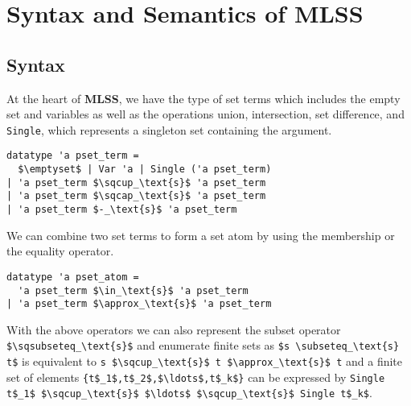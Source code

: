 \documentclass[sigplan,10pt,anonymous,review]{acmart}
\begin{document}
\section{Syntax and Semantics of MLSS\label{sec:semantics}}
\subsection{Syntax}
At the heart of \textbf{MLSS}, we have the type of set terms which includes the empty set and variables as well as the operations union, intersection, set difference, and \lstinline!Single!, which represents a singleton set containing the argument.
\begin{lstlisting}
datatype 'a pset_term =
  $\emptyset$ | Var 'a | Single ('a pset_term)
| 'a pset_term $\sqcup_\text{s}$ 'a pset_term
| 'a pset_term $\sqcap_\text{s}$ 'a pset_term
| 'a pset_term $-_\text{s}$ 'a pset_term
\end{lstlisting}
We can combine two set terms to form a set atom by using the membership or the equality operator.
\begin{lstlisting}
datatype 'a pset_atom =
  'a pset_term $\in_\text{s}$ 'a pset_term
| 'a pset_term $\approx_\text{s}$ 'a pset_term
\end{lstlisting}
With the above operators we can also represent the subset operator \lstinline!$\sqsubseteq_\text{s}$! and enumerate finite sets as \lstinline!$s \subseteq_\text{s} t$! is equivalent to \lstinline!s $\sqcup_\text{s}$ t $\approx_\text{s}$ t! and a finite set of elements \lstinline!{t$_1$,t$_2$,$\ldots$,t$_k$}! can be expressed by \lstinline!Single t$_1$ $\sqcup_\text{s}$ $\ldots$ $\sqcup_\text{s}$ Single t$_k$!.
\end{document}

